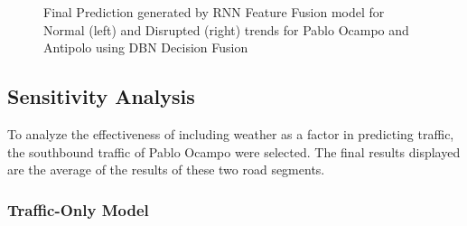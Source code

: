 \begin{figure}[h]
  \centering
  \captionsetup{justification=centering}
  \caption{Final Prediction generated by RNN Feature Fusion model for Normal (left) and Disrupted (right) trends for Pablo Ocampo and Antipolo using DBN Decision Fusion}
  \label{fig:final_prediction}
\end{figure}































\subsection{Sensitivity Analysis}
To analyze the effectiveness of including weather as a factor in predicting traffic, the southbound traffic of Pablo Ocampo were selected. The final results displayed are the average of the results of these two road segments.

\subsubsection{Traffic-Only Model}

